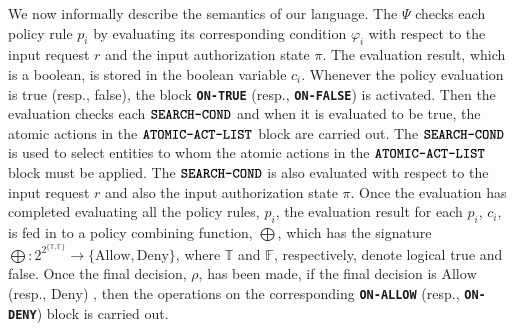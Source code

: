 \documentclass{sig-alternate}
\newcommand{\state}{\ensuremath{\pi}\xspace}
\newcommand{\policyfunc}{\ensuremath{\Psi}\xspace}
\newcommand{\funcname}[1]{\textbf{\texttt{#1}}}
\newcommand{\Allow}{\ensuremath{\mbox{Allow}}\xspace}
\newcommand{\Deny}{\ensuremath{\mbox{Deny}}\xspace}
\newcommand{\policy}{\ensuremath{\varphi}\xspace}
\newcommand{\true}{\ensuremath{\mathbb{T}}\xspace}
\newcommand{\false}{\ensuremath{\mathbb{F}}\xspace}
\begin{document}
We now informally describe the semantics of our language. The \policyfunc checks each policy rule $p_i$ by 
evaluating its corresponding condition  $\policy_i$ with respect to the input request $r$ and the 
input authorization state \state. The evaluation result, which is a boolean, is stored in the boolean 
variable $c_i$. Whenever the policy evaluation is true (resp., false), the block \funcname{ON-TRUE} (resp., \funcname{ON-FALSE}) 
is activated. Then the evaluation checks each $\funcname{SEARCH-COND}$ and when it is evaluated to be true, 
the atomic actions in the $\funcname{ATOMIC-ACT-LIST}$ block are carried out. The $\funcname{SEARCH-COND}$ is used to 
select entities to whom the atomic actions in the $\funcname{ATOMIC-ACT-LIST}$ block must be applied. 
The $\funcname{SEARCH-COND}$ is also evaluated with respect to the input request $r$ and also the input authorization state $\state$. 
Once the evaluation has completed evaluating all the policy rules, $p_i$, the evaluation result for each $p_i$, $c_i$, is fed in to 
a policy combining function, $\bigoplus$, which has the signature $\bigoplus : 2^{2^{\{\true, \false\}}}\rightarrow\{\Allow, \Deny\}$, where 
 \true and \false, respectively, denote logical true and false. Once the final decision, $\rho$, has been made, if the final decision is 
 \Allow (resp., \Deny) , then the operations on the corresponding \funcname{ON-ALLOW} (resp.,  \funcname{ON-DENY}) block is carried out. 
\end{document}
